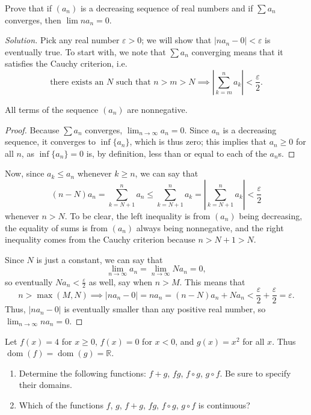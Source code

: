 \documentclass[11pt]{scrartcl}
\providecommand{\eps}{\varepsilon}
\providecommand{\RR}{\mathbb R}
\providecommand{\ii}{\item}
\theoremstyle{problem}
\newenvironment{problem}[1]
{\renewcommand\theinnercustomthm{#1}\innercustomthm}
{\endinnercustomthm}
\theoremstyle{remark}
\newenvironment{soln}{\begin{proof}[Solution]}{\end{proof}}
\providecommand{\abs}[1]{\left|#1\right|}
\begin{document}
\begin{problem}{15.7a}
	Prove that if $(a_n)$ is a decreasing sequence of real numbers
	and if $\sum a_n$ converges, then $\lim na_n = 0$.
\end{problem}

\begin{soln}
	Pick any real number $\eps > 0$; we will show that
	$|na_n - 0| < \eps$ is eventually true.
	To start with, we note that $\sum a_n$ converging means that it satisfies
	the Cauchy criterion, i.e.
	\[\text{there exists an $N$ such that } n > m > N\implies
	\abs{\sum_{k=m}^n a_k} < \frac{\eps}{2}.\]
	
	\begin{claim*}
		All terms of the sequence $(a_n)$ are nonnegative.
	\end{claim*}
	\begin{proof}
		Because $\sum a_n$ converges, $\lim_{n\to\infty} a_n = 0$.
		Since $a_n$ is a decreasing sequence,
		it converges to $\inf\{a_n\}$, which is thus zero;
		this implies that $a_n \ge 0$ for all $n$,
		as $\inf\{a_n\} = 0$ is, by definition,
		less than or equal to each of the $a_n$s.
	\end{proof}
	
	Now, since $a_k \le a_n$ whenever $k \ge n$, we can say that
	\[(n - N)a_n = \sum_{k=N+1}^n a_n \le \sum_{k=N+1}^n a_k =
	\abs{\sum_{k=N+1}^n a_k} < \frac{\eps}{2}\]
	whenever $n > N$. To be clear, the left inequality
	is from $(a_n)$ being decreasing, the equality of sums is
	from $(a_n)$ always being nonnegative,
	and the right inequality comes from the Cauchy criterion
	because $n > N+1 > N$.
	
	Since $N$ is just a constant, we can say that
	\[\lim_{n\to\infty} a_n = \lim_{n\to\infty} Na_n = 0,\]
	so eventually $Na_n < \frac\eps2$ as well, say when $n > M$.
	This means that
	\[n > \max(M, N)\implies
	|na_n - 0| = na_n = (n - N)a_n + Na_n < \frac\eps2 + \frac\eps2 = \eps.\]
	Thus, $|na_n - 0|$ is eventually smaller than any positive real number,
	so $\lim_{n\to\infty} na_n = 0$.
\end{soln}

\pagebreak
\begin{problem}{17.2}
	Let $f(x) = 4$ for $x \ge 0$, $f(x) = 0$ for $x < 0$,
	and $g(x) = x^2$ for all $x$. Thus $\operatorname{dom}(f)
	= \operatorname{dom}(g) = \RR$.
	\begin{enumerate}[\emph{\textbf{(\alph*)}}]
		\ii Determine the following functions:
		$f + g$, $fg$, $f\circ g$, $g\circ f$.
		Be sure to specify their domains.
		\ii Which of the functions
		$f$, $g$, $f + g$, $fg$, $f\circ g$, $g\circ f$ is continuous?
	\end{enumerate}
\end{problem}
\end{document}
